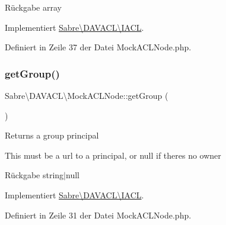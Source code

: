 \begin{DoxyReturn}{Rückgabe}
array 
\end{DoxyReturn}


Implementiert \mbox{\hyperlink{interface_sabre_1_1_d_a_v_a_c_l_1_1_i_a_c_l_a8fe3b3a5b48eae789d7eb722b340045c}{Sabre\textbackslash{}\+D\+A\+V\+A\+C\+L\textbackslash{}\+I\+A\+CL}}.



Definiert in Zeile 37 der Datei Mock\+A\+C\+L\+Node.\+php.

\mbox{\label{class_sabre_1_1_d_a_v_a_c_l_1_1_mock_a_c_l_node_af63c8a7655e4bb7eb9770369619af403}} 
\subsubsection{\texorpdfstring{get\+Group()}{getGroup()}}
{\footnotesize\ttfamily Sabre\textbackslash{}\+D\+A\+V\+A\+C\+L\textbackslash{}\+Mock\+A\+C\+L\+Node\+::get\+Group (\begin{DoxyParamCaption}{ }\end{DoxyParamCaption})}

Returns a group principal

This must be a url to a principal, or null if there\textquotesingle{}s no owner

\begin{DoxyReturn}{Rückgabe}
string$\vert$null 
\end{DoxyReturn}


Implementiert \mbox{\hyperlink{interface_sabre_1_1_d_a_v_a_c_l_1_1_i_a_c_l_a8ba38d5a99d771d7ae2719dd483515f6}{Sabre\textbackslash{}\+D\+A\+V\+A\+C\+L\textbackslash{}\+I\+A\+CL}}.



Definiert in Zeile 31 der Datei Mock\+A\+C\+L\+Node.\+php.

\mbox{\label{class_sabre_1_1_d_a_v_a_c_l_1_1_mock_a_c_l_node_accfb75d9c0a586cdb2501e323c6b0f02}} 
